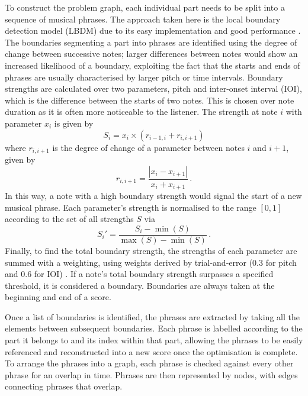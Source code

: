 \documentclass[aps,pra,12pt,onecolumn]{revtex4-2}
\begin{document}
To construct the problem graph, each individual part needs to be split into a sequence of musical phrases. The approach taken here is the local boundary detection model (LBDM) due to its easy implementation and good performance \cite{cambouropoulos_lbdm_2011}. The boundaries segmenting a part into phrases are identified using the degree of change between successive notes; larger differences between notes would show an increased likelihood of a boundary, exploiting the fact that the starts and ends of phrases are usually characterised by larger pitch or time intervals. Boundary strengths are calculated over two parameters, pitch and inter-onset interval (IOI), which is the difference between the starts of two notes. This is chosen over note duration as it is often more noticeable to the listener. The strength at note $i$ with parameter $x_i$ is given by
\begin{equation}
    S_i=x_i\times (r_{i-1, i} + r_{i, i+1})
    \label{eq:boundary-strength}
\end{equation}
where $r_{i, i+1}$ is the degree of change of a parameter between notes $i$ and $i+1$, given by
\begin{equation}
    r_{i, i+1}=\frac{|x_{i}-x_{i+1}|}{x_{i}+x_{i+1}} \,.
    \label{eq:degree-change}
\end{equation}
In this way, a note with a high boundary strength would signal the start of a new musical phrase. Each parameter's strength is normalised to the range $[0,1]$ according to the set of all strengths $S$ via
\begin{equation}
    S_i'=\frac{S_i-\min(S)}{\max(S)-\min(S)} \,.
    \label{eq:normalisation}
\end{equation}
Finally, to find the total boundary strength, the strengths of each parameter are summed with a weighting, using weights derived by trial-and-error ($0.3$ for pitch and $0.6$ for IOI) \cite{cambouropoulos_lbdm_2011}. If a note's total boundary strength surpasses a specified threshold, it is considered a boundary. Boundaries are always taken at the beginning and end of a score.

Once a list of boundaries is identified, the phrases are extracted by taking all the elements between subsequent boundaries. Each phrase is labelled according to the part it belongs to and its index within that part, allowing the phrases to be easily referenced and reconstructed into a new score once the optimisation is complete. To arrange the phrases into a graph, each phrase is checked against every other phrase for an overlap in time. Phrases are then represented by nodes, with edges connecting phrases that overlap.
\end{document}
